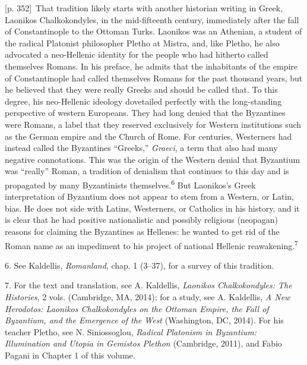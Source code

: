 \documentclass[10pt,a4paper]{article}
\begin{document}
{\scriptsize\color{gray}[p. 352]}\ That tradition likely starts with another historian writing in Greek, Laonikos Chalkokondyles, in the mid-fifteenth century, immediately after the fall of Constantinople to the Ottoman Turks. Laonikos was an Athenian, a student of the radical Platonist philosopher Pletho at Mistra, and, like Pletho, he also advocated a neo-Hellenic identity for the people who had hitherto called themselves Romans. In his preface, he admits that the inhabitants of the empire of Constantinople had called themselves Romans for the past thousand years, but he believed that they were really Greeks and should be called that. To this degree, his neo-Hellenic ideology dovetailed perfectly with the long-standing perspective of western Europeans. They had long denied that the Byzantines were Romans, a label that they reserved exclusively for Western institutions such as the German empire and the Church of Rome. For centuries, Westerners had instead called the Byzantines “Greeks,” \textit{Graeci}, a term that also had many negative connotations. This was the origin of the Western denial that Byzantium was “really” Roman, a tradition of denialism that continues to this day and is propagated by many Byzantinists themselves.\nobreak\textsuperscript{6} But Laonikos’s Greek interpretation of Byzantium does not appear to stem from a Western, or Latin, bias. He does not side with Latins, Westerners, or Catholics in his history, and it is clear that he had positive nationalistic and possibly religious (neopagan) reasons for claiming the Byzantines as Hellenes: he wanted to get rid of the Roman name as an impediment to his project of national Hellenic reawakening.\nobreak\textsuperscript{7}\par{\small 6.  See Kaldellis, \textit{Romanland}, chap. 1 (3–37), for a survey of this tradition.\par}{\small 7.  For the text and translation, see A. Kaldellis, \textit{Laonikos Chalkokondyles: The Histories}, 2 vols. (Cambridge, MA, 2014); for a study, see A. Kaldellis, \textit{A New Herodotos: Laonikos Chalkokondyles on the Ottoman Empire, the Fall of Byzantium, and the Emergence of the West} (Washington, DC, 2014). For his teacher Pletho, see N. Siniossoglou, \textit{Radical Platonism in Byzantium: Illumination and Utopia in Gemistos Plethon} (Cambridge, 2011), and Fabio Pagani in Chapter 1 of this volume.\par}
\end{document}
